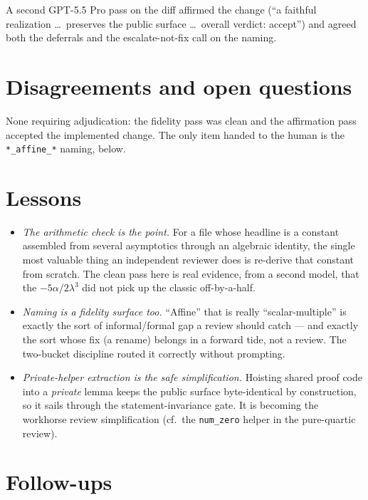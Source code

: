 \documentclass[11pt]{article}
\begin{document}
A second GPT-5.5 Pro pass on the diff affirmed the change (``a faithful realization
\dots\ preserves the public surface \dots\ overall verdict: accept'') and agreed both
the deferrals and the escalate-not-fix call on the naming.

\section{Disagreements and open questions}

None requiring adjudication: the fidelity pass was clean and the affirmation pass
accepted the implemented change. The only item handed to the human is the
\texttt{*\_affine\_*} naming, below.

\section{Lessons}

\begin{itemize}
\item \emph{The arithmetic check is the point.} For a file whose headline is a
  constant assembled from several asymptotics through an algebraic identity, the
  single most valuable thing an independent reviewer does is re-derive that constant
  from scratch. The clean pass here is real evidence, from a second model, that the
  $-5\alpha/2\lambda^3$ did not pick up the classic off-by-a-half.
\item \emph{Naming is a fidelity surface too.} ``Affine'' that is really
  ``scalar-multiple'' is exactly the sort of informal/formal gap a review should
  catch --- and exactly the sort whose fix (a rename) belongs in a forward tide, not
  a review. The two-bucket discipline routed it correctly without prompting.
\item \emph{Private-helper extraction is the safe simplification.} Hoisting shared
  proof code into a \emph{private} lemma keeps the public surface byte-identical by
  construction, so it sails through the statement-invariance gate. It is becoming the
  workhorse review simplification (cf.\ the \texttt{num\_zero} helper in the
  pure-quartic review).
\end{itemize}

\section{Follow-ups}
\end{document}
